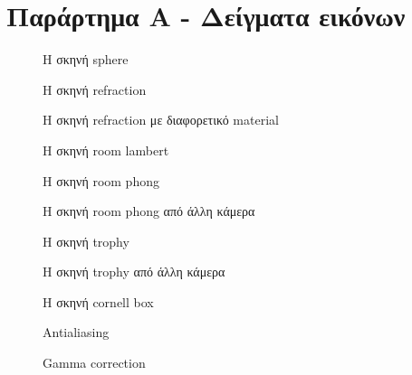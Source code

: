 \chapter{Παράρτημα Α - Δείγματα εικόνων}

\graphicspath{{appendix1/fig/}}

\begin{figure} 
\centering 
\caption{H σκηνή sphere}
\end{figure}

\begin{figure} 
\centering 
\caption{H σκηνή refraction}
\end{figure}

\begin{figure} 
\centering 
\caption{H σκηνή refraction με διαφορετικό material}
\end{figure}

\begin{figure} 
\centering 
\caption{H σκηνή room lambert}
\end{figure}

\begin{figure} 
\centering 
\caption{H σκηνή room phong}
\end{figure}

\begin{figure} 
\centering 
\caption{H σκηνή room phong από άλλη κάμερα}
\end{figure}

\begin{figure} 
\centering 
\caption{H σκηνή trophy}
\end{figure}

\begin{figure} 
\centering 
\caption{H σκηνή trophy από άλλη κάμερα}
\end{figure}

\begin{figure} 
\centering 
\caption{H σκηνή cornell box}
\end{figure}

\begin{figure} 
\centering 
\caption{Antialiasing}
\end{figure}

\begin{figure} 
\centering 
\caption{Gamma correction}
\end{figure}
